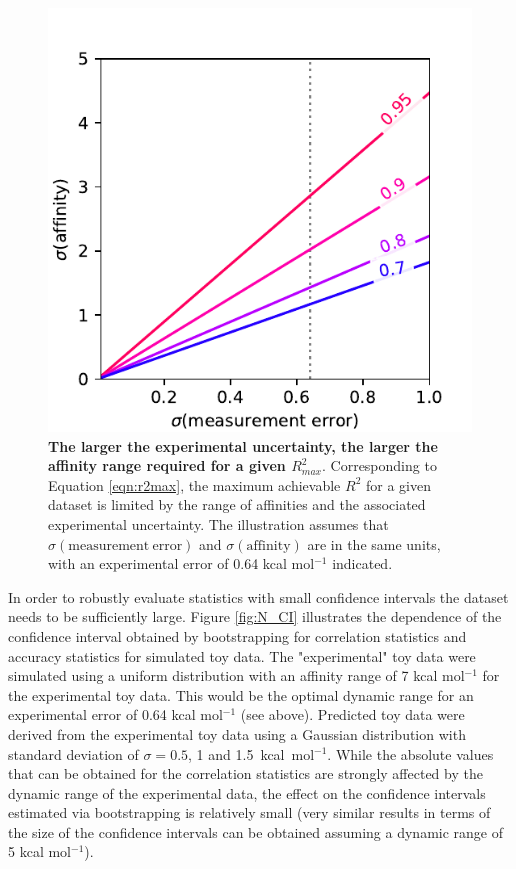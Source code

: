 \documentclass[9pt,bestpractices]{livecoms}
\begin{document}
\begin{figure}
    \includegraphics[width=0.95\linewidth]{figures/R2max.pdf}
    \caption{\textbf{The larger the experimental uncertainty, the larger the affinity range required for a given $R^2_{max}$}. Corresponding to Equation \ref{eqn:r2max}, the maximum achievable $R^2$ for a given dataset is limited by the range of affinities and the associated experimental uncertainty. The illustration assumes that $\sigma(\mathrm{measurement\ error})$ and $\sigma(\mathrm{affinity})$ are in the same units, with an experimental error of 0.64 kcal mol$^{-1}$ indicated.}
    \label{fig:r2max}
\end{figure}

In order to robustly evaluate statistics with small confidence intervals the dataset needs to be sufficiently large. 
Figure \ref{fig:N_CI} illustrates the dependence of the confidence interval obtained by bootstrapping for correlation statistics and accuracy statistics for simulated toy data. 
The "experimental" toy data were simulated using a uniform distribution with an affinity range of 7 kcal mol$^{-1}$ for the experimental toy data. 
This would be the optimal dynamic range for an experimental error of 0.64 kcal mol$^{-1}$ (see above). 
Predicted toy data were derived from the experimental toy data using a Gaussian distribution with standard deviation of $\sigma = 0.5$, 1 and 1.5~kcal~mol$^{-1}$. 
While the absolute values that can be obtained for the correlation statistics are strongly affected by the dynamic range of the experimental data, the effect on the confidence intervals estimated via bootstrapping is relatively small (very similar results in terms of the size of the confidence intervals can be obtained assuming a dynamic range of 5 kcal mol$^{-1}$).
\end{document}
